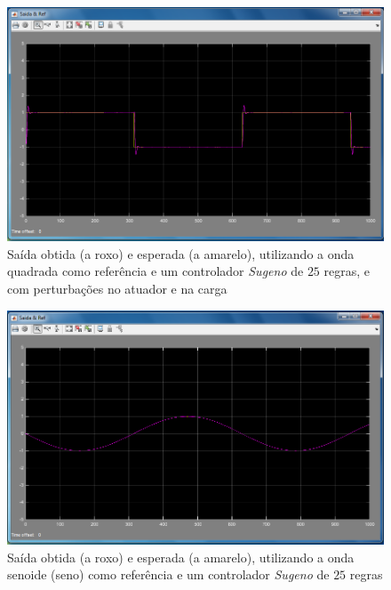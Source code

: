 \documentclass{article}
\begin{document}
\begin{figure}[h]
  \centering
      \includegraphics[scale=0.3]{Images/Sugeno_25_square_actuator_charge.png}
  \caption{Saída obtida (a roxo) e esperada (a amarelo), utilizando a onda quadrada como referência e um controlador \emph{Sugeno} de $25$ regras, e com perturbações no atuador e na carga}
\end{figure}


\begin{figure}[h]
  \centering
      \includegraphics[scale=0.3]{Images/Sugeno_25_sin.png}
  \caption{Saída obtida (a roxo) e esperada (a amarelo), utilizando a onda senoide (seno) como referência e um controlador \emph{Sugeno} de $25$ regras}
\end{figure}
\end{document}
